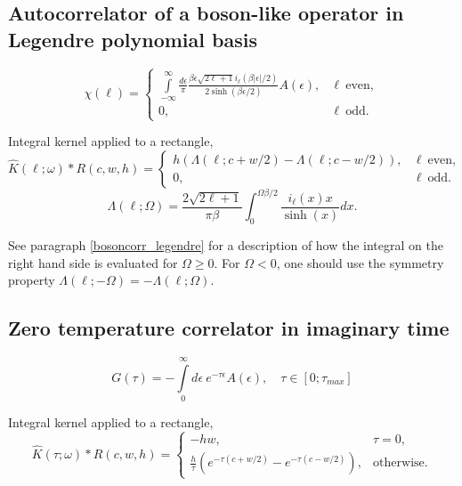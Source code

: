 \documentclass[]{article}
\begin{document}
\subsection{Autocorrelator of a boson-like operator in Legendre polynomial basis}
\label{bosonautocorr_legendre}
\begin{equation}
	\chi(\ell) = \left\{
		\begin{array}{ll}
		\int\limits_{-\infty}^\infty
		\frac{d\epsilon}{\pi}
		\frac{\beta\epsilon\sqrt{2\ell+1} i_{\ell}(\beta|\epsilon|/2)}
		{2\sinh(\beta\epsilon/2)} A(\epsilon), &\ell\ \mathrm{ even},\\
		0, &\ell\ \mathrm{odd}.
	\end{array}\right.
\end{equation}

Integral kernel applied to a rectangle,
\begin{equation}
	\hat K(\ell;\omega)*R(c,w,h) = \left\{
	\begin{array}{ll}
	h(\Lambda(\ell;c+w/2)-\Lambda(\ell;c-w/2)), &\ell\ \mathrm{ even},\\
	0, &\ell\ \mathrm{odd}.
	\end{array}\right.
\end{equation}
\begin{equation}
	\Lambda(\ell;\Omega) =
	\frac{2\sqrt{2\ell+1}}{\pi\beta}
	\int_0^{\Omega\beta/2} \frac{i_\ell(x) x}{\sinh(x)} dx.
\end{equation}

See paragraph \ref{bosoncorr_legendre} for a description of how the integral on
the right hand side is evaluated for $\Omega\geq0$. For $\Omega<0$, one should use the symmetry property $\Lambda(\ell;-\Omega) = -\Lambda(\ell;\Omega)$.

\subsection{Zero temperature correlator in imaginary time}
\label{zerotemp_imtime}
\begin{equation}
	G(\tau) = -\int\limits_0^\infty
	d\epsilon\ e^{-\tau\epsilon} A(\epsilon), \quad
	\tau\in[0;\tau_{max}]
\end{equation}

Integral kernel applied to a rectangle,
\begin{equation}
	\hat K(\tau;\omega)*R(c,w,h) =  \left\{
	\begin{array}{ll}
		-hw, &\tau=0,\\
		\frac{h}{\tau}(e^{-\tau(c+w/2)}-e^{-\tau(c-w/2)}) ,&\mathrm{otherwise}.
	\end{array}\right.
\end{equation}
\end{document}
